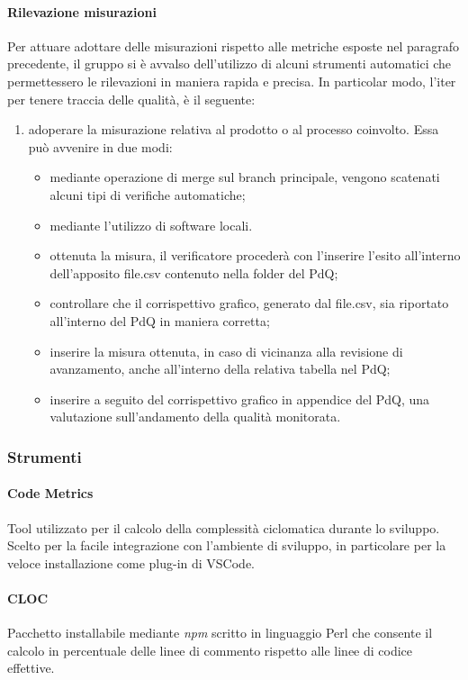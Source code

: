 \paragraph{Rilevazione misurazioni}
Per attuare adottare delle misurazioni rispetto alle metriche esposte nel paragrafo precedente, il gruppo si è avvalso dell'utilizzo di alcuni strumenti automatici che permettessero le rilevazioni in maniera rapida e precisa. In particolar modo, l'iter per tenere traccia delle qualità, è il seguente:
\begin{enumerate}
	\item adoperare la misurazione relativa al prodotto o al processo coinvolto. Essa può avvenire in due modi:
	\begin{itemize}
		\item mediante operazione di merge sul branch principale, vengono scatenati alcuni tipi di verifiche automatiche;
		\item mediante l'utilizzo di software locali.
	\item ottenuta la misura, il verificatore procederà con l'inserire l'esito all'interno dell'apposito file.csv contenuto nella folder del PdQ;
	\item controllare che il corrispettivo grafico, generato dal file.csv, sia riportato all'interno del PdQ in maniera corretta;
	\item inserire la misura ottenuta, in caso di vicinanza alla revisione di avanzamento, anche all'interno della relativa tabella nel PdQ;
	\item inserire a seguito del corrispettivo grafico in appendice del PdQ, una valutazione sull'andamento della qualità monitorata.  
	\end{itemize}
\end{enumerate}

\subsubsection{Strumenti}
\paragraph{Code Metrics}
Tool utilizzato per il calcolo della complessità ciclomatica durante lo sviluppo. Scelto per la facile integrazione con l'ambiente di sviluppo, in particolare per la veloce installazione come plug-in di VSCode.

\paragraph{CLOC}
Pacchetto installabile mediante \textit{npm\glo} scritto in linguaggio Perl che consente il calcolo in percentuale delle linee di commento rispetto alle linee di codice effettive.

